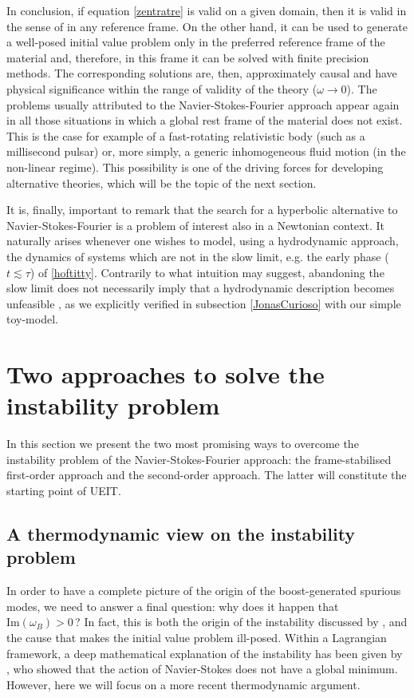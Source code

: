 \documentclass[a4paper, amsfonts, amssymb, amsmath, reprint, twocolumn, showkeys, nofootinbib]{revtex4-2}
\begin{document}
In conclusion, if equation \eqref{zentratre} is valid on a given domain, then it is valid in the sense of \citet{Geroch95} in any reference frame. On the other hand,  it can be used to generate a well-posed initial value problem only in the preferred reference frame of the material and, therefore, in this frame it can be solved with finite precision methods. The corresponding solutions are, then, approximately causal and have physical significance within the range of validity of the theory ($\omega \rightarrow 0$). 
The problems usually attributed to the Navier-Stokes-Fourier approach appear again in all those situations in which a global rest frame of the material does not exist. This is the case for example of a fast-rotating relativistic body (such as a millisecond pulsar) or, more simply, a generic inhomogeneous fluid motion (in the non-linear regime). This possibility is one of the driving forces for developing alternative theories, which will be the topic of the next section. 

It is, finally, important to remark that the search for a hyperbolic alternative to Navier-Stokes-Fourier is a problem of interest also in a Newtonian context. It naturally arises whenever one wishes to model, using a hydrodynamic approach, the dynamics of systems which are not in the slow limit, e.g. the early phase ($t \lesssim \tau$) of \eqref{hoftitty}. Contrarily to what intuition may suggest, abandoning the slow limit does not necessarily imply that a hydrodynamic description becomes unfeasible \cite{Jou_Extended,AnilePavon1998,Herrera2001}, as we explicitly verified in subsection \ref{JonasCurioso} with our simple toy-model.

\section{Two approaches to solve the instability problem}

In this section we present the two most promising ways to overcome the instability problem of the Navier-Stokes-Fourier approach: the frame-stabilised first-order approach and the second-order approach. The latter will constitute the starting point of UEIT.


\subsection{A thermodynamic view on the instability problem}

In order to have a complete picture of the origin of the boost-generated spurious modes, we need to answer a final question: why does it happen that $\text{Im}(\omega_B)>0 \,$? In fact, this is both the origin of the instability discussed by \citet{Hiscock_Insatibility_first_order}, and the cause that makes the initial value problem ill-posed. Within a Lagrangian framework, a deep mathematical explanation of the instability has been given by \citet{TorrieriIS2016}, who showed that the action of Navier-Stokes does not have a global minimum. However, here we will focus on a more recent thermodynamic argument. 
\end{document}
